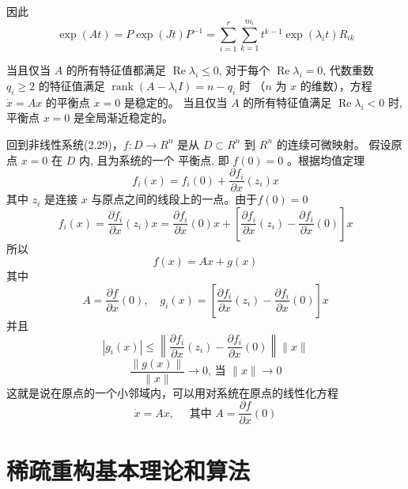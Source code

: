 因此
\begin{equation}
    \exp (A t)=P \exp (J t) P^{-1}=\sum_{i=1}^r \sum_{k=1}^{m_i} t^{k-1} \exp \left(\lambda_i t\right) R_{i k}
\end{equation}
\begin{theorem}
    当且仅当 $A$ 的所有特征值都满足 $\operatorname{Re} \lambda_i \leqslant 0$, 对于每个 $\operatorname{Re} \lambda_i=0$,
    代数重数 $q_i \geqslant 2$ 的特征值满足 $\operatorname{rank}\left(A-\lambda_i I\right)=n-q_i$ 时
    （$n$ 为 $x$ 的维数），方程 $\dot{x}=A x$ 的平衡点 $x=0$ 是稳定的。 
    当且仅当 $A$ 的所有特征值满足 $\operatorname{Re} \lambda_i<0$ 时, 平衡点 $x=0$ 是全局渐近稳定的。
\end{theorem}
回到非线性系统(2.29)，$f: D \rightarrow R^n$ 是从 $D \subset R^n$ 到 $R^n$ 的连续可微映射。
假设原点 $x=0$ 在 $D$ 内, 且为系统的一个 平衡点, 即 $f(0)=0$ 。根据均值定理
\begin{equation}
    f_i(x)=f_i(0)+\frac{\partial f_i}{\partial x}\left(z_i\right) x
\end{equation}
其中 $z_i$ 是连接 $x$ 与原点之间的线段上的一点。由于$f(0)=0$
\begin{equation}
    f_i(x)=\frac{\partial f_i}{\partial x}\left(z_i\right) x=\frac{\partial f_i}{\partial x}(0) x+\left[\frac{\partial f_i}{\partial x}\left(z_i\right)-\frac{\partial f_i}{\partial x}(0)\right] x
\end{equation}
所以
\begin{equation}
    f(x)=A x+g(x)
\end{equation}
其中
\begin{equation}
    A=\frac{\partial f}{\partial x}(0), \quad g_i(x)=\left[\frac{\partial f_i}{\partial x}\left(z_i\right)-\frac{\partial f_i}{\partial x}(0)\right] x
\end{equation}
并且
\begin{equation}
    \left|g_i(x)\right| \leqslant\left\|\frac{\partial f_i}{\partial x}\left(z_i\right)-\frac{\partial f_i}{\partial x}(0)\right\|\|x\|
\end{equation}
\begin{equation}
    \frac{\|g(x)\|}{\|x\|} \rightarrow 0 \text {, 当 }\|x\| \rightarrow 0
\end{equation}
这就是说在原点的一个小邻域内，可以用对系统在原点的线性化方程
\begin{equation}
    \dot{x}=A x, \quad \text { 其中 } A=\frac{\partial f}{\partial x}(0)
\end{equation}


\section{稀疏重构基本理论和算法}
